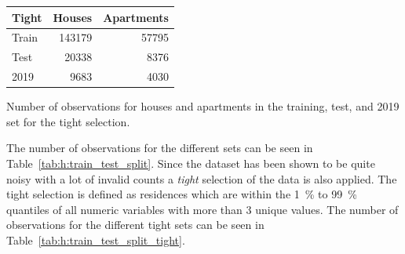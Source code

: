 \begin{margintable}[-2cm]
  \begin{tabular}{lrr}
   Tight      & Houses        & Apartments  \\ \midrule
   Train      & \num{143179}  & \num{57795} \\   
   Test       & \num{20338}   & \num{8376}  \\   
   \num{2019} & \num{9683}    & \num{4030} 
  \end{tabular}
  \vspace{3mm}
  \caption[Number of Observations in the Housing Dataset for the Tight Selection]{\label{tab:h:train_test_split_tight}Number of observations for houses and apartments in the training, test, and \num{2019} set for the tight selection.}
  \vspace{3mm}
\end{margintable}

The number of observations for the different sets can be seen in Table~\ref{tab:h:train_test_split}. Since the dataset has been shown to be quite noisy with a lot of invalid counts a \emph{tight} selection of the data is also applied. The tight selection is defined as residences which are within the \SI{1}{\percent} to \SI{99}{\percent} quantiles of all numeric variables with more than 3 unique values. The number of observations for the different tight sets can be seen in Table~\ref{tab:h:train_test_split_tight}. 

